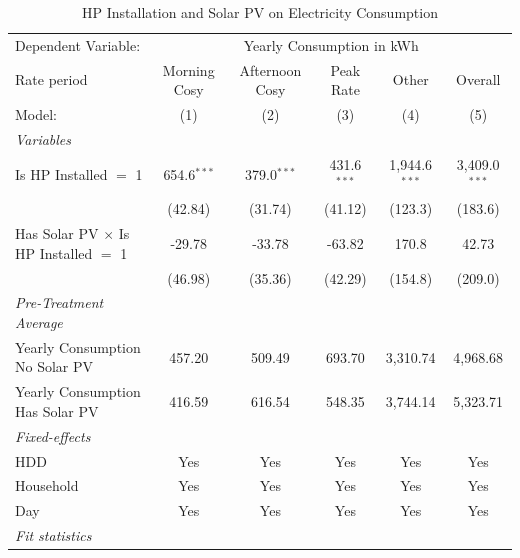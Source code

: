 
\begin{table}[htbp]
   \caption{\label{tab:hp-did-solar} HP Installation and Solar PV on Electricity Consumption }
   \centering
   \begin{tabular}{lccccc}
      \tabularnewline \midrule \midrule
      Dependent Variable: & \multicolumn{5}{c}{Yearly Consumption in kWh}\\
      Rate period                                  & Morning Cosy  & Afternoon Cosy & Peak Rate     & Other           & Overall \\   
      Model:                                       & (1)           & (2)            & (3)           & (4)             & (5)\\  
      \midrule
      \emph{Variables}\\
      Is HP Installed $=$ 1                        & 654.6$^{***}$ & 379.0$^{***}$  & 431.6$^{***}$ & 1,944.6$^{***}$ & 3,409.0$^{***}$\\   
                                                   & (42.84)       & (31.74)        & (41.12)       & (123.3)         & (183.6)\\   
      Has Solar PV $\times$ Is HP Installed $=$ 1  & -29.78        & -33.78         & -63.82        & 170.8           & 42.73\\   
                                                   & (46.98)       & (35.36)        & (42.29)       & (154.8)         & (209.0)\\   
      \midrule
\emph{Pre-Treatment Average}\\
      Yearly Consumption No Solar PV               & 457.20        & 509.49         & 693.70        & 3,310.74        & 4,968.68\\  
      Yearly Consumption Has Solar PV              & 416.59        & 616.54         & 548.35        & 3,744.14        & 5,323.71\\  
\midrule
      \emph{Fixed-effects}\\
      HDD                                          & Yes           & Yes            & Yes           & Yes             & Yes\\  
      Household                                    & Yes           & Yes            & Yes           & Yes             & Yes\\  
      Day                                          & Yes           & Yes            & Yes           & Yes             & Yes\\  
      \midrule
      \emph{Fit statistics}\\

\end{tabular}
\end{table}
